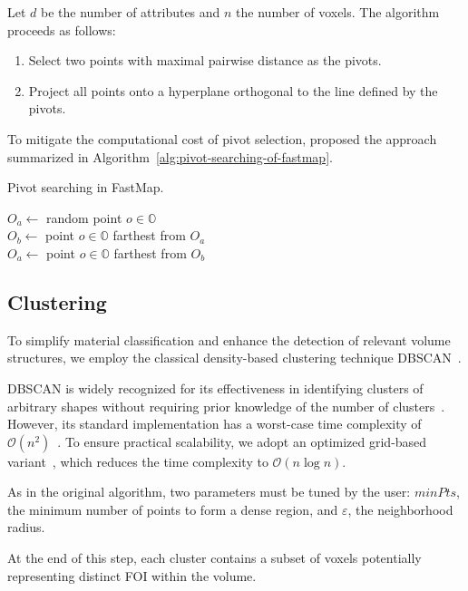 Let $d$ be the number of attributes and $n$ the number of voxels. The algorithm proceeds as follows:

\begin{enumerate}
    \item Select two points with maximal pairwise distance as the pivots.
    \item Project all points onto a hyperplane orthogonal to the line defined by the pivots.
\end{enumerate}

To mitigate the computational cost of pivot selection, \cite{faloutsos1995} proposed the approach summarized in Algorithm~\ref{alg:pivot-searching-of-fastmap}.

\begin{algorithm}
    \caption{Pivot searching in FastMap.}
    \label{alg:pivot-searching-of-fastmap}
    $O_a \gets$ random point $o \in \mathbb{O}$\\
    $O_b \gets$ point $o \in \mathbb{O}$ farthest from $O_a$\\
    $O_a \gets$ point $o \in \mathbb{O}$ farthest from $O_b$
\end{algorithm}

\subsection{Clustering}
\label{subsect:clustering}

To simplify material classification and enhance the detection of relevant volume structures, we employ the classical density-based clustering technique DBSCAN~\cite{ester1996}.

DBSCAN is widely recognized for its effectiveness in identifying clusters of arbitrary shapes without requiring prior knowledge of the number of clusters~\cite{schubert2017}. However, its standard implementation has a worst-case time complexity of $\mathcal{O}(n^2)$~\cite{schubert2017}. To ensure practical scalability, we adopt an optimized grid-based variant~\cite{gunawan2013}, which reduces the time complexity to $\mathcal{O}(n \log n)$.

As in the original algorithm, two parameters must be tuned by the user: $minPts$, the minimum number of points to form a dense region, and $\varepsilon$, the neighborhood radius.

At the end of this step, each cluster contains a subset of voxels potentially representing distinct FOI within the volume.


